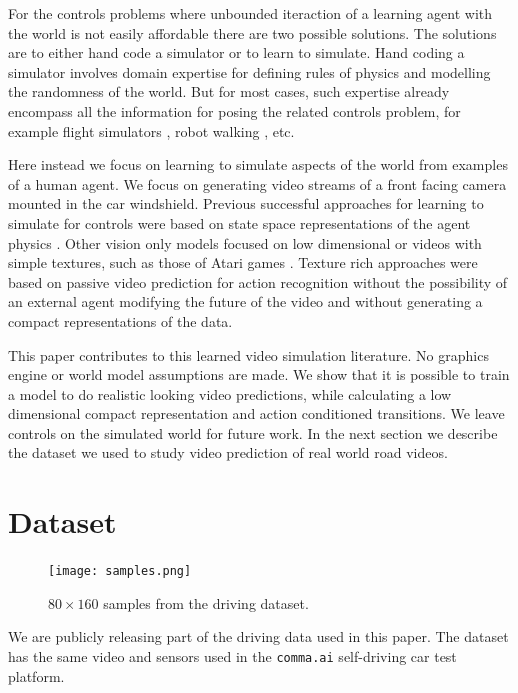 \documentclass{article} %
\begin{document}
For the controls problems where unbounded iteraction of a learning agent with the world is not easily affordable there are two possible solutions.
The solutions are to either hand code a simulator or to learn to simulate. Hand coding a simulator involves domain expertise for defining
rules of physics and modelling the randomness of the world. But for most cases, such expertise already encompass all the information for
posing the related controls problem, for example flight simulators \cite{flyandcontrol}, robot walking \cite{bipedal}, etc.

Here instead we focus on learning to simulate aspects of the world from examples of a human agent. We focus on generating video streams of a
front facing camera mounted in the car windshield. Previous successful approaches for learning to simulate for controls were based on
state space representations of the agent physics \cite{nghelicopter}. Other vision only models focused on low dimensional \cite{e2c} or videos with simple
textures, such as those of Atari games \cite{condpred} \cite{learn2think}. Texture rich approaches were based on passive video prediction
for action recognition \cite{beyondmse} without the possibility of an external agent modifying the future of the video and without generating a compact representations
of the data.

This paper contributes to this learned video simulation literature. No graphics engine or world model assumptions are made. We show that it is possible
to train a model to do realistic looking video predictions, while
calculating a low dimensional compact representation and action conditioned transitions. We leave controls on the simulated world for future work.
In the next section we describe the dataset we used to study video prediction of real world road videos.

\section{Dataset}
\label{sec:data}

\begin{figure}[t]
 \centering
 \texttt{[image: samples.png]}
 \caption{$80 \times 160$ samples from the driving dataset.}
 \label{fig:samples}
\end{figure}

We are publicly releasing part of the driving data used in this paper. The dataset has the same video and sensors
used in the \texttt{comma.ai} self-driving car test platform.
\end{document}
